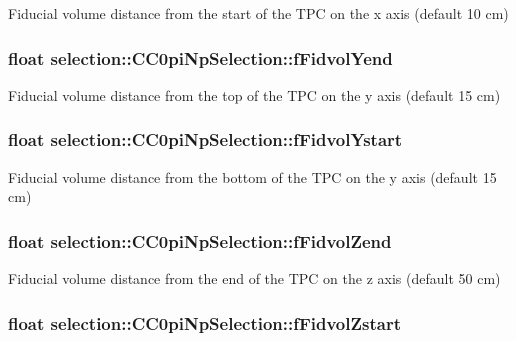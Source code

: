 Fiducial volume distance from the start of the T\-P\-C on the x axis (default 10 cm) \hypertarget{classselection_1_1CC0piNpSelection_a4732dc1091cb1881c741d57f999b5035}{
\subsubsection[{f\-Fidvol\-Yend}]{\setlength{\rightskip}{0pt plus 5cm}float selection\-::\-C\-C0pi\-Np\-Selection\-::f\-Fidvol\-Yend\hspace{0.3cm}{\ttfamily [private]}}}\label{classselection_1_1CC0piNpSelection_a4732dc1091cb1881c741d57f999b5035}
Fiducial volume distance from the top of the T\-P\-C on the y axis (default 15 cm) \hypertarget{classselection_1_1CC0piNpSelection_ac59a66f695af8314018029e4480db16a}{
\subsubsection[{f\-Fidvol\-Ystart}]{\setlength{\rightskip}{0pt plus 5cm}float selection\-::\-C\-C0pi\-Np\-Selection\-::f\-Fidvol\-Ystart\hspace{0.3cm}{\ttfamily [private]}}}\label{classselection_1_1CC0piNpSelection_ac59a66f695af8314018029e4480db16a}
Fiducial volume distance from the bottom of the T\-P\-C on the y axis (default 15 cm) \hypertarget{classselection_1_1CC0piNpSelection_a9ac28bcb4ef95573d416dec35202b18e}{
\subsubsection[{f\-Fidvol\-Zend}]{\setlength{\rightskip}{0pt plus 5cm}float selection\-::\-C\-C0pi\-Np\-Selection\-::f\-Fidvol\-Zend\hspace{0.3cm}{\ttfamily [private]}}}\label{classselection_1_1CC0piNpSelection_a9ac28bcb4ef95573d416dec35202b18e}
Fiducial volume distance from the end of the T\-P\-C on the z axis (default 50 cm) \hypertarget{classselection_1_1CC0piNpSelection_afe5a2b82ecad103b98362839094c47e0}{
\subsubsection[{f\-Fidvol\-Zstart}]{\setlength{\rightskip}{0pt plus 5cm}float selection\-::\-C\-C0pi\-Np\-Selection\-::f\-Fidvol\-Zstart\hspace{0.3cm}{\ttfamily [private]}}}\label{classselection_1_1CC0piNpSelection_afe5a2b82ecad103b98362839094c47e0}
